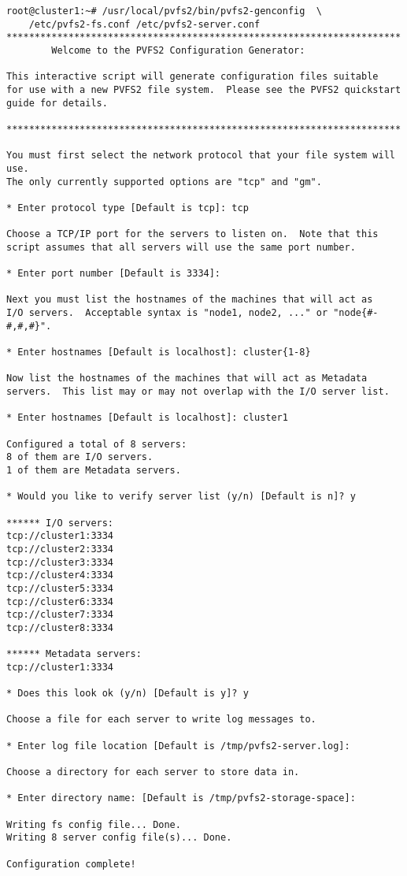 \documentclass[11pt, letterpaper]{article}
\begin{document}
\begin{verbatim}
root@cluster1:~# /usr/local/pvfs2/bin/pvfs2-genconfig  \
	/etc/pvfs2-fs.conf /etc/pvfs2-server.conf
**********************************************************************
        Welcome to the PVFS2 Configuration Generator:

This interactive script will generate configuration files suitable
for use with a new PVFS2 file system.  Please see the PVFS2 quickstart
guide for details.

**********************************************************************

You must first select the network protocol that your file system will use.
The only currently supported options are "tcp" and "gm".

* Enter protocol type [Default is tcp]: tcp

Choose a TCP/IP port for the servers to listen on.  Note that this
script assumes that all servers will use the same port number.

* Enter port number [Default is 3334]: 

Next you must list the hostnames of the machines that will act as
I/O servers.  Acceptable syntax is "node1, node2, ..." or "node{#-#,#,#}".

* Enter hostnames [Default is localhost]: cluster{1-8}

Now list the hostnames of the machines that will act as Metadata
servers.  This list may or may not overlap with the I/O server list.

* Enter hostnames [Default is localhost]: cluster1

Configured a total of 8 servers:
8 of them are I/O servers.
1 of them are Metadata servers.

* Would you like to verify server list (y/n) [Default is n]? y

****** I/O servers:
tcp://cluster1:3334
tcp://cluster2:3334
tcp://cluster3:3334
tcp://cluster4:3334
tcp://cluster5:3334
tcp://cluster6:3334
tcp://cluster7:3334
tcp://cluster8:3334

****** Metadata servers:
tcp://cluster1:3334

* Does this look ok (y/n) [Default is y]? y

Choose a file for each server to write log messages to.

* Enter log file location [Default is /tmp/pvfs2-server.log]: 

Choose a directory for each server to store data in.

* Enter directory name: [Default is /tmp/pvfs2-storage-space]: 

Writing fs config file... Done.
Writing 8 server config file(s)... Done.

Configuration complete!
\end{verbatim}
\end{document}
